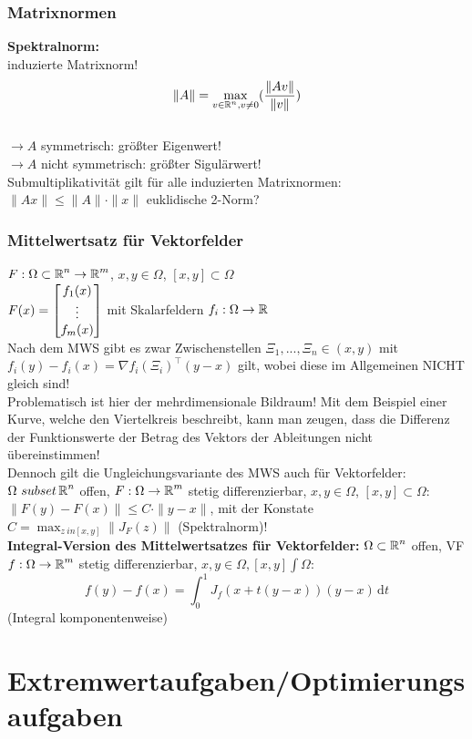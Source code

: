 \documentclass[german]{latex4ei/latex4ei_sheet}
\begin{document}
\subsubsection{Matrixnormen}
\textbf{Spektralnorm:}\\
induzierte Matrixnorm!\\
\[\|A\|=\max_{v \in \operatorname{\mathbb R}^n, v \neq 0} (\frac{\|A v \|}{\|v\|})\]\\
$\rightarrow A$ symmetrisch: gr\"o\ss{}ter Eigenwert!\\
$\rightarrow A$ nicht symmetrisch: gr\"o\ss{}ter Sigul\"arwert!\\
Submultiplikativit\"at gilt f\"ur alle induzierten Matrixnormen:
$\|A x\| \le \|A\| \cdot \|x\|$
euklidische 2-Norm?

\subsubsection{Mittelwertsatz f\"ur Vektorfelder}
$F: \Omega \subset \operatorname{\mathbb R}^n \to \operatorname{\mathbb R}^m$, $x,y \in \Omega$, $[x,y] \subset \Omega$\\
$F(x)=\mat{f_1(x) \\ \vdots \\ f_m(x)}$ mit Skalarfeldern $f_i: \Omega \to \operatorname{\mathbb R}$\\
Nach dem MWS gibt es zwar Zwischenstellen $\Xi_1,...,\Xi_n \in (x,y)$ mit $f_i(y)-f_i(x)=\nabla f_i (\Xi_i)^\top (y-x)$ gilt, wobei diese im Allgemeinen NICHT gleich sind!\\
Problematisch ist hier der mehrdimensionale Bildraum! Mit dem Beispiel einer Kurve, welche den Viertelkreis beschreibt, kann man zeugen, dass die Differenz der Funktionswerte der Betrag des Vektors der Ableitungen nicht \"ubereinstimmen!\\
Dennoch gilt die Ungleichungsvariante des MWS auch f\"ur Vektorfelder:\\
$\Omega \ subset \operatorname{\mathbb R}^n$ offen, $F:\Omega \to \operatorname{\mathbb R}^m$ stetig differenzierbar, $x,y \in \Omega$, $[x,y] \subset \Omega$:\\
$\|F(y)-F(x)\|\le C \cdot \|y-x\|$, mit der Konstate $C = \max_{z \ in [x,y]} \|J_F (z)\|$ (Spektralnorm)!\\
\textbf{Integral-Version des Mittelwertsatzes f\"ur Vektorfelder:} $\Omega \subset \operatorname{\mathbb R}^n$ offen, VF $f: \Omega \to \operatorname{\mathbb R}^m$ stetig differenzierbar, $x,y \in \Omega, [x,y]\int \Omega$: \[f(y)-f(x)=\int_0^1 \! J_f(x+t(y-x))(y-x) \, \mathrm{d}t\] (Integral komponentenweise)
 
\section{Extremwertaufgaben/Optimierungsaufgaben}
\end{document}
